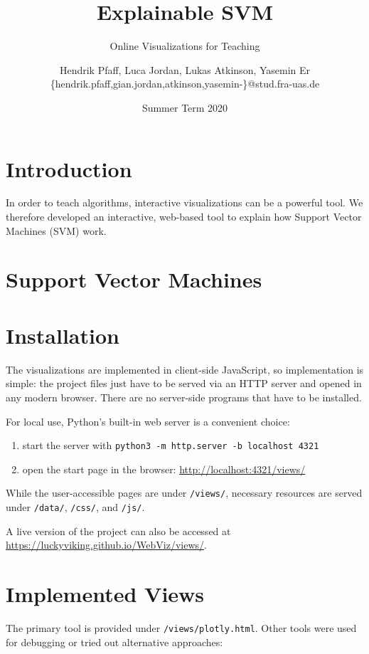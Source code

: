 \documentclass{scrartcl}
\title{Explainable SVM}
\subtitle{Online Visualizations for Teaching}
\author{
  Hendrik Pfaff, Luca Jordan, Lukas Atkinson, Yasemin Er
  \\
  {\normalsize\ttfamily \{hendrik.pfaff,gian.jordan,atkinson,yasemin-\}@stud.fra-uas.de}
}
\date{Summer Term 2020}
\begin{document}
\maketitle

\section{Introduction}

In order to teach algorithms, interactive visualizations can be a powerful tool.
We therefore developed an interactive, web-based tool
to explain how Support Vector Machines (SVM) work.

\section{Support Vector Machines}


\section{Installation}

The visualizations are implemented in client-side JavaScript,
so implementation is simple:
the project files just have to be served via an HTTP server
and opened in any modern browser.
There are no server-side programs that have to be installed.

For local use, Python's built-in web server is a convenient choice:

\begin{enumerate}
\item start the server with \verb|python3 -m http.server -b localhost 4321|
\item open the start page in the browser: \url{http://localhost:4321/views/}
\end{enumerate}

While the user-accessible pages are under \verb|/views/|,
necessary resources are served under
\verb|/data/|, \verb|/css/|, and \verb|/js/|.

A live version of the project can also be accessed at
\url{https://luckyviking.github.io/WebViz/views/}.

\section{Implemented Views}

The primary tool is provided under \verb|/views/plotly.html|.
Other tools were used for debugging or tried out alternative approaches:
\end{document}
